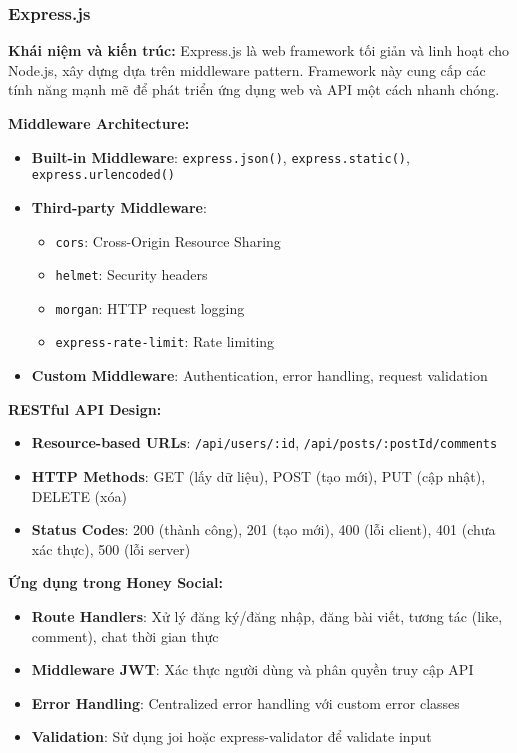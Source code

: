 \subsubsection{Express.js}
\textbf{Khái niệm và kiến trúc:}
Express.js là web framework tối giản và linh hoạt cho Node.js, xây dựng dựa trên middleware pattern. Framework này cung cấp các tính năng mạnh mẽ để phát triển ứng dụng web và API một cách nhanh chóng.

\textbf{Middleware Architecture:}
\begin{itemize}
\item \textbf{Built-in Middleware}: \texttt{express.json()}, \texttt{express.static()}, \texttt{express.urlencoded()}
\item \textbf{Third-party Middleware}: 
  \begin{itemize}
  \item \texttt{cors}: Cross-Origin Resource Sharing
  \item \texttt{helmet}: Security headers
  \item \texttt{morgan}: HTTP request logging
  \item \texttt{express-rate-limit}: Rate limiting
  \end{itemize}
\item \textbf{Custom Middleware}: Authentication, error handling, request validation
\end{itemize}

\textbf{RESTful API Design:}
\begin{itemize}
\item \textbf{Resource-based URLs}: \texttt{/api/users/:id}, \texttt{/api/posts/:postId/comments}
\item \textbf{HTTP Methods}: GET (lấy dữ liệu), POST (tạo mới), PUT (cập nhật), DELETE (xóa)
\item \textbf{Status Codes}: 200 (thành công), 201 (tạo mới), 400 (lỗi client), 401 (chưa xác thực), 500 (lỗi server)
\end{itemize}

\textbf{Ứng dụng trong Honey Social:}
\begin{itemize}
\item \textbf{Route Handlers}: Xử lý đăng ký/đăng nhập, đăng bài viết, tương tác (like, comment), chat thời gian thực
\item \textbf{Middleware JWT}: Xác thực người dùng và phân quyền truy cập API
\item \textbf{Error Handling}: Centralized error handling với custom error classes
\item \textbf{Validation}: Sử dụng joi hoặc express-validator để validate input
\end{itemize}

